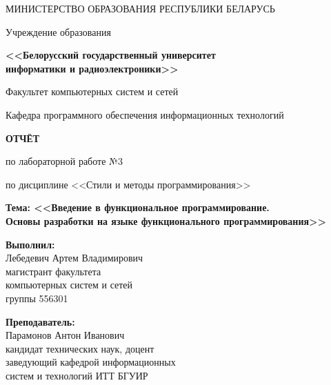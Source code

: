 \documentclass[14pt,a4paper]{extarticle}
\begin{document}
\thispagestyle{empty}
\begin{center}
МИНИСТЕРСТВО ОБРАЗОВАНИЯ РЕСПУБЛИКИ БЕЛАРУСЬ

\vspace{0.5em}

Учреждение образования

\textbf{<<Белорусский государственный университет\\информатики и радиоэлектроники>>}

\vspace{2em}

Факультет компьютерных систем и сетей

\vspace{0.5em}

Кафедра программного обеспечения информационных технологий
\end{center}

\vspace{4em}

\begin{center}
\textbf{ОТЧЁТ}

по лабораторной работе №3

\vspace{0.5em}

по дисциплине <<Стили и методы программирования>>

\vspace{1em}

\textbf{Тема: <<Введение в функциональное программирование.\\Основы разработки на языке функционального программирования>>}
\end{center}

\vspace{5em}

\begin{flushright}
\begin{minipage}{0.5\textwidth}
\textbf{Выполнил:}\\
Лебедевич Артем Владимирович\\
магистрант факультета\\
компьютерных систем и сетей\\
группы 556301

\vspace{1em}

\textbf{Преподаватель:}\\
Парамонов Антон Иванович\\
кандидат технических наук, доцент\\
заведующий кафедрой информационных\\
систем и технологий ИТТ БГУИР
\end{minipage}
\end{flushright}
\end{document}

